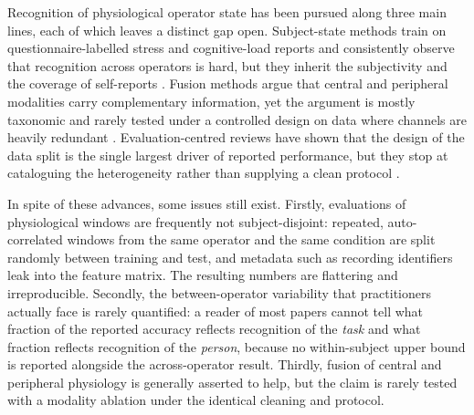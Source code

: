 \documentclass{llncs}
\begin{document}
Recognition of physiological operator state has been pursued along three main lines,
each of which leaves a distinct gap open. Subject-state methods train on
questionnaire-labelled stress and cognitive-load reports and consistently observe that
recognition across operators is hard, but they inherit the subjectivity and the
coverage of self-reports
\cite{bussolan2025multiphysiohrc,bussolan2024stressdetector,borghi2025operatorstress,aygun2022assistive}.
Fusion methods argue that central and peripheral modalities carry complementary
information, yet the argument is mostly taxonomic and rarely tested under a controlled
design on data where channels are heavily redundant \cite{baltrusaitis2019multimodal}.
Evaluation-centred reviews have shown that the design of the data split is the single
largest driver of reported performance, but they stop at cataloguing the heterogeneity
rather than supplying a clean protocol
\cite{jin2025cognitivestate,iarlori2024cognitiveworkload}.

In spite of these advances, some issues still exist. Firstly, evaluations of
physiological windows are frequently not subject-disjoint: repeated, auto-correlated
windows from the same operator and the same condition are split randomly between
training and test, and metadata such as recording identifiers leak into the feature
matrix. The resulting numbers are flattering and irreproducible. Secondly, the
between-operator variability that practitioners actually face is rarely quantified: a
reader of most papers cannot tell what fraction of the reported accuracy reflects
recognition of the \emph{task} and what fraction reflects recognition of the
\emph{person}, because no within-subject upper bound is reported alongside the
across-operator result. Thirdly, fusion of central and peripheral physiology is
generally asserted to help, but the claim is rarely tested with a modality ablation
under the identical cleaning and protocol.
\end{document}
